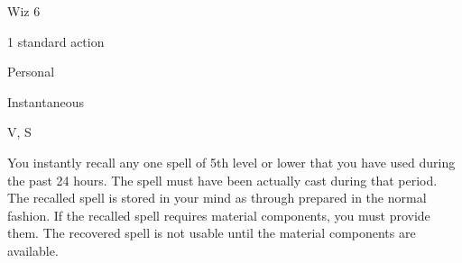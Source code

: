 
\begin{description*}
\item[Level:] Wiz 6
\item[Casting Time:] 1 standard action
\item[Range:] Personal
\item[Duration:] Instantaneous
\item[Components:] V, S
\end{description*}

You instantly recall any one spell of 5th level or lower that you have used during
the past 24 hours. The spell must have been actually cast during that period. The
recalled spell is stored in your mind as through prepared in the normal fashion.
If the recalled spell requires material components, you must provide them. The
recovered spell is not usable until the material components are available.